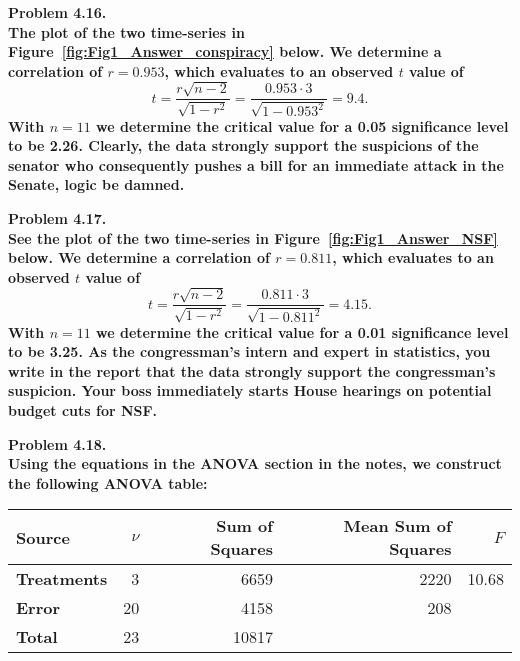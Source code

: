\noindent
\bf{Problem 4.16.} \\

The plot of the two time-series in Figure~\ref{fig:Fig1_Answer_conspiracy} below.  We determine a correlation
of $r = 0.953$, which evaluates to an observed $t$ value of  
$$
t = \frac{r\sqrt{n-2}}{\sqrt{1-r^2}} = \frac{0.953\cdot 3}{\sqrt{1-0.953^2}} = 9.4.
$$
With $n = 11$ we determine the critical value for a 0.05 significance level to be 2.26. Clearly,
the data strongly support the suspicions of the senator
who consequently pushes a bill for an immediate attack in the Senate, logic be damned.

\noindent
\bf{Problem 4.17.} \\

See the plot of the two time-series in Figure~\ref{fig:Fig1_Answer_NSF} below.  We determine a correlation
of $r = 0.811$, which evaluates to an observed $t$ value of  
$$
t = \frac{r\sqrt{n-2}}{\sqrt{1-r^2}} = \frac{0.811\cdot 3}{\sqrt{1-0.811^2}} = 4.15.
$$
With $n = 11$ we determine the critical value for a 0.01 significance level to be 3.25.  As the congressman's
intern and expert in statistics, you write in the report that the data strongly support the congressman's
suspicion. Your boss immediately starts House hearings on potential budget cuts for NSF.

\noindent
\bf{Problem 4.18.} \\

Using the equations in the ANOVA section in the notes, we construct the following ANOVA table:
\begin{table}[H]
\centering
\begin{tabular}{|l|r|r|r|r|} \hline
\bf{Source} & $\nu$ & \bf{Sum of Squares} & \bf{ Mean Sum of Squares} & $F$ \\ \hline
\bf{Treatments} & 3 & 6659 & 2220 &  10.68 \\ \hline
\bf{Error} & 20 & 4158 & 208 &  \\ \hline
\bf{Total} & 23 & 10817 &  &  \\ \hline
\end{tabular}
\end{table}

